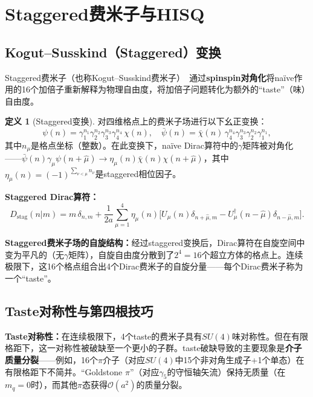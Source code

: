 \documentclass[12pt,a4paper]{ctexart}
\theoremstyle{definition}
\newtheorem{definition}{定义}[section]
\begin{document}
\section{Staggered费米子与HISQ}

\subsection{Kogut--Susskind（Staggered）变换}

Staggered费米子（也称Kogut--Susskind费米子）~\cite{KogutSusskind1975}通过\textbf{spinspin对角化}将na\"ive作用的16个加倍子重新解释为物理自由度，将加倍子问题转化为额外的``taste''（味）自由度。

\begin{definition}[Staggered变换]
对四维格点上的费米子场进行以下幺正变换：
\begin{equation}
\psi(n) = \gamma_1^{n_1}\gamma_2^{n_2}\gamma_3^{n_3}\gamma_4^{n_4}\,\chi(n), \quad
\bar\psi(n) = \bar\chi(n)\,\gamma_4^{n_4}\gamma_3^{n_3}\gamma_2^{n_2}\gamma_1^{n_1},
\label{eq:staggered_transform}
\end{equation}
其中$n_\mu$是格点坐标（整数）。在此变换下，na\"ive Dirac算符中的$\gamma$矩阵被对角化——$\bar\psi(n)\gamma_\mu\psi(n+\hat\mu) \to \eta_\mu(n)\bar\chi(n)\chi(n+\hat\mu)$，其中$\eta_\mu(n) = (-1)^{\sum_{\nu<\mu} n_\nu}$是staggered相位因子。
\end{definition}

\textbf{Staggered Dirac算符：}
\begin{equation}
D_{\text{stag}}(n|m) = m\,\delta_{n,m} + \frac{1}{2a}\sum_{\mu=1}^4 \eta_\mu(n)\big[U_\mu(n)\delta_{n+\hat\mu,m} - U_\mu^\dagger(n-\hat\mu)\delta_{n-\hat\mu,m}\big].
\label{eq:staggered_Dirac}
\end{equation}

\textbf{Staggered费米子场的自旋结构：}经过staggered变换后，Dirac算符在自旋空间中变为平凡的（无$\gamma$矩阵），自旋自由度分散到了$2^4=16$个超立方体的格点上。连续极限下，这16个格点组合出4个Dirac费米子的自旋分量——每个Dirac费米子称为一个``taste''。

\subsection{Taste对称性与第四根技巧}

\textbf{Taste对称性：}在连续极限下，4个taste的费米子具有$SU(4)$味对称性。但在有限格距下，这一对称性被破缺至一个更小的子群。taste破缺导致的主要现象是\textbf{介子质量分裂}——例如，16个$\pi$介子（对应$SU(4)$中15个非对角生成子+1个单态）在有限格距下不简并。``Goldstone $\pi$''（对应$\gamma_5$的守恒轴矢流）保持无质量（在$m_q=0$时），而其他$\pi$态获得$\mathcal{O}(a^2)$的质量分裂。
\end{document}
